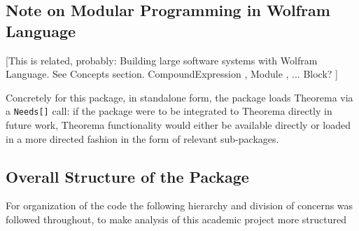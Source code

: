 \subsection{Note on Modular Programming in Wolfram Language} \label{modular-programming}

[This is related, probably: Building large software systems with Wolfram Language. See Concepts section. CompoundExpression \cite{noauthor_compoundexpressionwolfram_nodate}, Module \cite{noauthor_module_nodate}, ... Block? \cite{noauthor_blockwolfram_nodate}]

Concretely for this package, in standalone form, the package loads Theorema via a \lstinline{Needs[]} call: if the package were to be integrated to Theorema directly in future work, Theorema functionality would either be available directly or loaded in a more directed fashion in the form of relevant sub-packages.

\subsection{Overall Structure of the Package}

For organization of the code the following hierarchy and division of concerns was followed throughout, to make analysis of this academic project more structured

